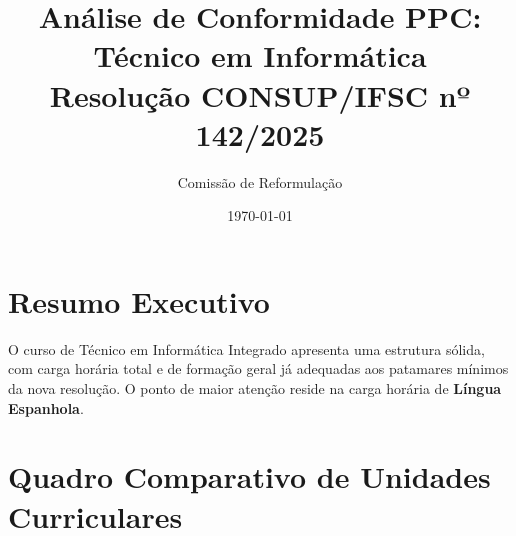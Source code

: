 \documentclass[a4paper,12pt]{article}
\title{\textbf{Análise de Conformidade PPC: Técnico em Informática} \\ \large Resolução CONSUP/IFSC nº 142/2025}
\author{Comissão de Reformulação}
\date{\today}
\begin{document}
\maketitle

\section{Resumo Executivo}
O curso de Técnico em Informática Integrado apresenta uma estrutura sólida, com carga horária total e de formação geral já adequadas aos patamares mínimos da nova resolução. O ponto de maior atenção reside na carga horária de \textbf{Língua Espanhola}.

\section{Quadro Comparativo de Unidades Curriculares}
\end{document}
